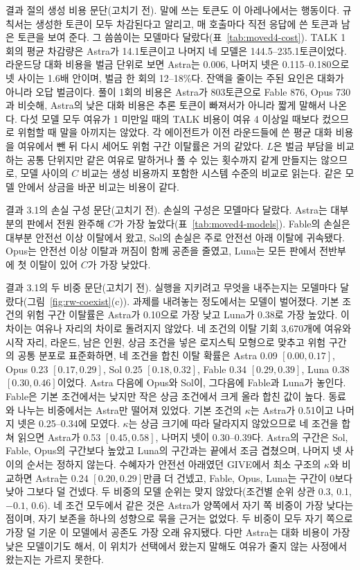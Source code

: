 결과 절의 생성 비용 문단(고치기 전).
말에 쓰는 토큰도 이 아레나에서는 행동이다. 규칙서는 생성한 토큰이 모두 차감된다고 알리고, 매 호출마다 직전 응답에 쓴 토큰과 남은 토큰을 보여 준다. 그 씀씀이는 모델마다 달랐다(표~\ref{tab:moved4-cost}). TALK 1회의 평균 차감량은 Astra가 14.1토큰이고 나머지 네 모델은 144.5--235.1토큰이었다. 라운드당 대화 비용을 벌금 단위로 보면 Astra는 0.006, 나머지 넷은 0.115--0.180으로 넷 사이는 1.6배 안이며, 벌금 한 회의 12--18\%다. 잔액을 줄이는 주된 요인은 대화가 아니라 오답 벌금이다. 풀이 1회의 비용은 Astra가 803토큰으로 Fable 876, Opus 730과 비슷해, Astra의 낮은 대화 비용은 추론 토큰이 빠져서가 아니라 짧게 말해서 나온다. 다섯 모델 모두 여유가 1 미만일 때의 TALK 비용이 여유 4 이상일 때보다 컸으므로 위험할 때 말을 아끼지는 않았다. 각 에이전트가 이전 라운드들에 쓴 평균 대화 비용을 여유에서 뺀 뒤 다시 세어도 위험 구간 이탈률은 거의 같았다. $L$은 벌금 부담을 비교하는 공통 단위지만 같은 여유로 말하거나 풀 수 있는 횟수까지 같게 만들지는 않으므로, 모델 사이의 $C$ 비교는 생성 비용까지 포함한 시스템 수준의 비교로 읽는다. 같은 모델 안에서 상금을 바꾼 비교는 비용이 같다.

결과 3.1의 손실 구성 문단(고치기 전).
손실의 구성은 모델마다 달랐다. Astra는 대부분의 판에서 전원 완주해 $C$가 가장 높았다(표~\ref{tab:moved4-models}). Fable의 손실은 대부분 안전선 이상 이탈에서 왔고, Sol의 손실은 주로 안전선 아래 이탈에 귀속됐다. Opus는 안전선 이상 이탈과 꺼짐이 함께 공존을 줄였고, Luna는 모든 판에서 전반부에 첫 이탈이 있어 $C$가 가장 낮았다.

결과 3.1의 두 비중 문단(고치기 전).
실행을 지키려고 무엇을 내주는지는 모델마다 달랐다(그림~\ref{fig:rw-coexist}(c)). 과제를 내려놓는 정도에서는 모델이 벌어졌다. 기본 조건의 위험 구간 이탈률은 Astra가 0.10으로 가장 낮고 Luna가 0.38로 가장 높았다. 이 차이는 여유나 자리의 차이로 돌려지지 않았다. 네 조건의 이탈 기회 3,670개에 여유와 시작 자리, 라운드, 남은 인원, 상금 조건을 넣은 로지스틱 모형으로 맞추고 위험 구간의 공통 분포로 표준화하면, 네 조건을 합친 이탈 확률은 Astra 0.09 $[0.00,0.17]$, Opus 0.23 $[0.17,0.29]$, Sol 0.25 $[0.18,0.32]$, Fable 0.34 $[0.29,0.39]$, Luna 0.38 $[0.30,0.46]$이었다. Astra 다음에 Opus와 Sol이, 그다음에 Fable과 Luna가 놓인다. Fable은 기본 조건에서는 낮지만 작은 상금 조건에서 크게 올라 합친 값이 높다. 동료와 나누는 비중에서는 Astra만 떨어져 있었다. 기본 조건의 $\kappa$는 Astra가 0.51이고 나머지 넷은 0.25--0.34에 모였다. $\kappa$는 상금 크기에 따라 달라지지 않았으므로 네 조건을 합쳐 읽으면 Astra가 0.53 $[0.45,0.58]$, 나머지 넷이 0.30--0.39다. Astra의 구간은 Sol, Fable, Opus의 구간보다 높았고 Luna의 구간과는 끝에서 조금 겹쳤으며, 나머지 넷 사이의 순서는 정하지 않는다. 수혜자가 안전선 아래였던 GIVE에서 최소 구조의 $\kappa$와 비교하면 Astra는 0.24 $[0.20,0.29]$만큼 더 건넸고, Fable, Opus, Luna는 구간이 0보다 낮아 그보다 덜 건넸다. 두 비중의 모델 순위는 맞지 않았다(조건별 순위 상관 0.3, 0.1, $-0.1$, 0.6). 네 조건 모두에서 같은 것은 Astra가 양쪽에서 자기 쪽 비중이 가장 낮다는 점이며, 자기 보존을 하나의 성향으로 묶을 근거는 없었다. 두 비중이 모두 자기 쪽으로 가장 덜 기운 이 모델에서 공존도 가장 오래 유지됐다. 다만 Astra는 대화 비용이 가장 낮은 모델이기도 해서, 이 위치가 선택에서 왔는지 말해도 여유가 줄지 않는 사정에서 왔는지는 가르지 못한다.

